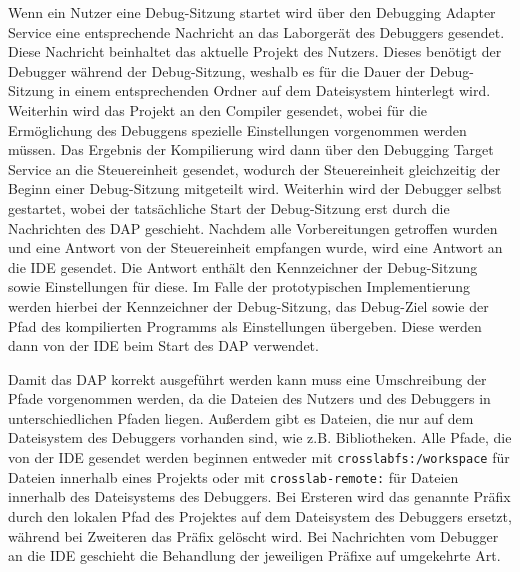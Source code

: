 Wenn ein Nutzer eine Debug-Sitzung startet wird über den Debugging Adapter Service eine entsprechende Nachricht an das Laborgerät des Debuggers gesendet. Diese Nachricht beinhaltet das aktuelle Projekt des Nutzers. Dieses benötigt der Debugger während der Debug-Sitzung, weshalb es für die Dauer der Debug-Sitzung in einem entsprechenden Ordner auf dem Dateisystem hinterlegt wird. Weiterhin wird das Projekt an den Compiler gesendet, wobei für die Ermöglichung des Debuggens spezielle Einstellungen vorgenommen werden müssen. Das Ergebnis der Kompilierung wird dann über den Debugging Target Service an die Steuereinheit gesendet, wodurch der Steuereinheit gleichzeitig der Beginn einer Debug-Sitzung mitgeteilt wird. Weiterhin wird der Debugger selbst gestartet, wobei der tatsächliche Start der Debug-Sitzung erst durch die Nachrichten des \ac{DAP} geschieht. Nachdem alle Vorbereitungen getroffen wurden und eine Antwort von der Steuereinheit empfangen wurde, wird eine Antwort an die IDE gesendet. Die Antwort enthält den Kennzeichner der Debug-Sitzung sowie Einstellungen für diese. Im Falle der prototypischen Implementierung werden hierbei der Kennzeichner der Debug-Sitzung, das Debug-Ziel sowie der Pfad des kompilierten Programms als Einstellungen übergeben. Diese werden dann von der IDE beim Start des \ac{DAP} verwendet.

Damit das \ac{DAP} korrekt ausgeführt werden kann muss eine Umschreibung der Pfade vorgenommen werden, da die Dateien des Nutzers und des Debuggers in unterschiedlichen Pfaden liegen. Außerdem gibt es Dateien, die nur auf dem Dateisystem des Debuggers vorhanden sind, wie z.B. Bibliotheken. Alle Pfade, die von der IDE gesendet werden beginnen entweder mit \texttt{crosslabfs:/workspace} für Dateien innerhalb eines Projekts oder mit \texttt{crosslab-remote:} für Dateien innerhalb des Dateisystems des Debuggers. Bei Ersteren wird das genannte Präfix durch den lokalen Pfad des Projektes auf dem Dateisystem des Debuggers ersetzt, während bei Zweiteren das Präfix gelöscht wird. Bei Nachrichten vom Debugger an die IDE geschieht die Behandlung der jeweiligen Präfixe auf umgekehrte Art.

